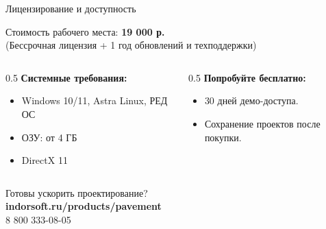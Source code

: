 \documentclass[aspectratio=169]{beamer}
\begin{document}
\begin{frame}{Лицензирование и доступность}
    \begin{center}
        \Large Стоимость рабочего места: \alert{\textbf{19 000 р.}} \\
        \normalsize (Бессрочная лицензия + 1 год обновлений и техподдержки)
    \end{center}
    
    \vspace{0.5cm}
    \begin{columns}
        \begin{column}{0.5\textwidth}
            \textbf{Системные требования:}
            \begin{itemize}
                \item Windows 10/11, Astra Linux, РЕД ОС
                \item ОЗУ: от 4 ГБ
                \item DirectX 11
            \end{itemize}
        \end{column}
        \begin{column}{0.5\textwidth}
            \textbf{Попробуйте бесплатно:}
            \begin{itemize}
                \item 30 дней демо-доступа.
                \item Сохранение проектов после покупки.
            \end{itemize}
        \end{column}
    \end{columns}
\end{frame}

\begin{frame}[standout]
    Готовы ускорить проектирование? \\
    \vspace{0.5cm}
    \normalsize \textbf{indorsoft.ru/products/pavement} \\
    \normalsize 8 800 333-08-05
\end{frame}
\end{document}
